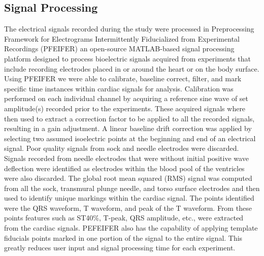 \documentclass[twocolumn]{cinc}
\begin{document}
%


\subsection{Signal Processing}

The electrical signals recorded during the study were processed in Preprocessing Framework for Electrograms Intermittently Fiducialized from Experimental Recordings (PFEIFER) an open-source MATLAB-based signal processing platform designed to process bioelectric signals acquired from experiments that include recording electrodes placed in or around the heart or on the body surface. \cite{Rodenhauser2018} Using PFEIFER we were able to calibrate, baseline correct, filter, and mark specific time instances within cardiac signals for analysis. Calibration was performed on each individual channel by acquiring a reference sine wave of set amplitude(s) recorded prior to the experiments. These acquired signals where then used to extract a correction factor to be applied to all the recorded signals, resulting in a gain adjustment. A linear baseline drift correction was applied by selecting two assumed isoelectric points at the beginning and end of an electrical signal. Poor quality signals from sock and needle electrodes were discarded. Signals recorded from needle electrodes that were without initial positive wave deflection were identified as electrodes within the blood pool of the ventricles were also discarded. The global root mean squared (RMS) signal was computed from all the sock, transmural plunge needle, and torso surface electrodes and then used to identify unique markings within the cardiac signal. The points identified were the QRS waveform, T waveform, and peak of the T waveform. From these points features such as ST40\%, T-peak, QRS amplitude, etc., were extracted from the cardiac signals. PEFEIFER also has the capability of applying template fiducials points marked in one portion of the signal to the entire signal. This greatly reduces user input and signal processing time for each experiment. 
\end{document}
